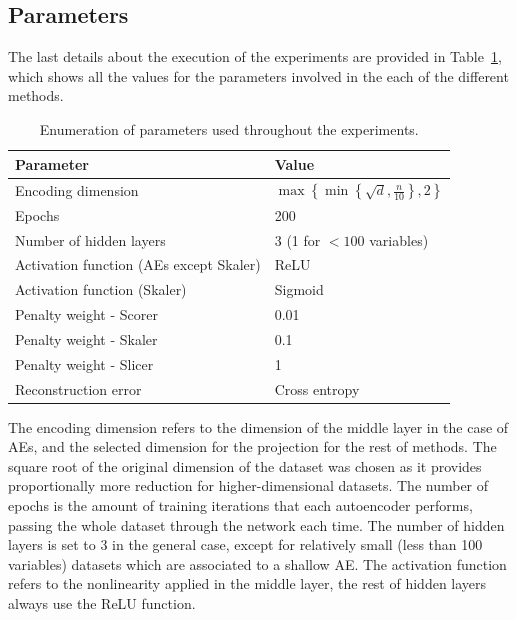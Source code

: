 \documentclass[
	fontsize=11pt, %
	twoside=false, %
	open=any, %
	secnumdepth=1, %
]{kaobook}
\begin{document}
\subsection{Parameters}

The last details about the execution of the experiments are provided in Table~\ref{tbl.params}, which shows all the values for the parameters involved in the each of the different methods.

\begin{table}[ht]
  \centering
  \caption{\label{tbl.params}Enumeration of parameters used throughout the experiments.}
  \begin{tabular}{ll}
    \toprule
    Parameter                               & Value                                                            \\
    \midrule
    Encoding dimension                      & $\max\left\{\min\left\{\sqrt d, \frac{n}{10}\right\}, 2\right\}$ \\
    Epochs                                  & 200                                                              \\
    Number of hidden layers                 & 3 (1 for $<100$ variables)                                       \\
    Activation function (AEs except Skaler) & ReLU                                                             \\
    Activation function (Skaler)            & Sigmoid                                                          \\
    Penalty weight - Scorer                 & 0.01                                                             \\
    Penalty weight - Skaler                 & 0.1                                                              \\
    Penalty weight - Slicer                 & 1                                                                \\
    Reconstruction error                    & Cross entropy                                                    \\
    \bottomrule
  \end{tabular}
\end{table}

\iffalse The encoding dimension refers to the dimension of the middle layer in the case of AEs, and the selected dimension for the projection for the rest of methods. The square root of the original dimension of the dataset was chosen as it provides proportionally more reduction for higher-dimensional datasets.
  The number of epochs is the amount of training iterations that each autoencoder performs, passing the whole dataset through the network each time. The number of hidden layers is set to 3 in the general case, except for relatively small (less than 100 variables) datasets which are associated to a shallow AE. The activation function refers to the nonlinearity applied in the middle layer, the rest of hidden layers always use the ReLU function.
\end{document}
